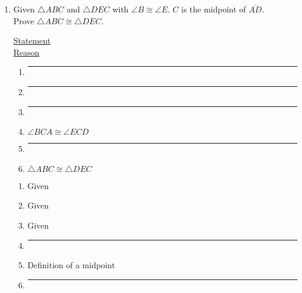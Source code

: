 \documentclass[12pt, twoside]{article}
\begin{document}
\begin{enumerate}
    \item Given $\triangle ABC$ and $\triangle DEC$ with $\angle B \cong \angle E$. $C$ is the midpoint of $\overline{AD}$.\\ Prove $\triangle ABC \cong \triangle DEC$.\\[0.5cm]

       \begin{multicols}{2}
         \underline{Statement} \\
         \underline{Reason}
       \end{multicols}
       \begin{multicols}{2}
         \raggedcolumns
         \begin{enumerate}[label={\arabic*)}]
           \item \rule{4cm}{0.15mm} \vspace{0.3cm}
           \item \rule{4cm}{0.15mm} \vspace{0.3cm}
           \item \rule{4cm}{0.15mm} \vspace{0.3cm}
           \item $\angle BCA \cong \angle ECD$  \vspace{0.3cm}
           \item \rule{4cm}{0.15mm} \vspace{0.3cm}
           \item $\triangle ABC \cong \triangle DEC$ \vspace{0.3cm}
         \end{enumerate}
         \begin{enumerate}[label={\arabic*)}]
           \item Given \vspace{0.3cm}
           \item Given \vspace{0.3cm}
           \item Given \vspace{0.3cm}
           \item \rule{4cm}{0.15mm} \vspace{0.3cm}
           \item Definition of a midpoint \vspace{0.3cm}
           \item \rule{4cm}{0.15mm} \vspace{0.3cm}
         \end{enumerate}
       \end{multicols} %


\end{enumerate}
\end{document}
